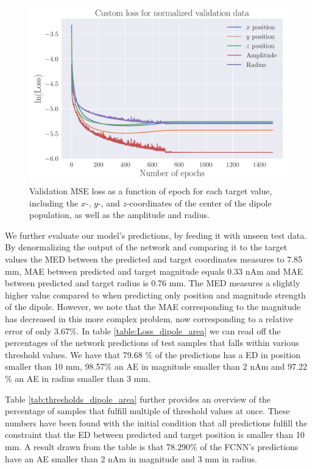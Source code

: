 \documentclass[a4paper, UKenglish, 11pt]{uiomaster}
\begin{document}
\begin{figure}[!htb]
    \centering
    \includegraphics[width=\linewidth]{figures/NN_area/Custom_Loss_mse_targets_area_seed_42_cnn_32_0.001_0.35_0.1_0_1500_(0).pdf}
    \caption{Validation MSE loss as a function of epoch for each target value, including the $x$-, $y$-, and $z$-coordinates of the center of the dipole population, as well as the amplitude and radius.}
    \label{fig:dipole_area_target_result}
\end{figure}

\FloatBarrier


We further evaluate our model's predictions, by feeding it with unseen test data. By denormalizing the output of the network and comparing it to the target values the MED between the predicted and target coordinates measures to 7.85 mm, MAE between predicted and target magnitude equals 0.33 nAm and MAE between predicted and target radius is 0.76 mm. The MED measures a slightly higher value compared to when predicting only position and magnitude strength of the dipole. However, we note that the MAE corresponding to the magnitude has decreased in this more complex problem, now corresponding to a relative error of only 3.67$\%$. In table \ref{table:Loss_dipole_area} we can read off the percentages of the network predictions of test samples that falls within various threshold values. We have that 79.68 $\%$ of the predictions has a ED in position smaller than 10 mm, 98.57$\%$ an AE in magnitude smaller than 2 nAm and 97.22$\%$ an AE in radius smaller than 3 mm.

Table \ref{tab:thresholds_dipole_area} further provides an overview of the percentage of samples that fulfill multiple of threshold values at once. These numbers have been found with the initial condition that all predictions fulfill the constraint that the ED between predicted and target position is smaller than 10 mm. A result drawn from the table is that 78.290$\%$ of the FCNN's predictions have an AE smaller than 2 nAm in magnitude and 3 mm in radius.
\end{document}
